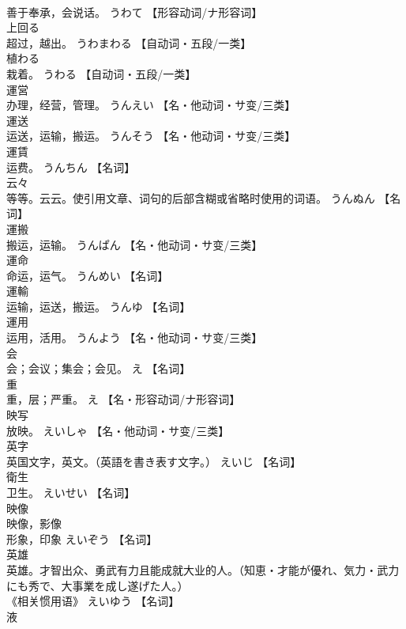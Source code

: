 \documentclass[8pt]{extreport}
\begin{document}
\begin{CJK}{UTF8}{min}
\\	善于奉承，会说话。	うわて		【形容动词/ナ形容词】
\\	上回る	
\\	超过，越出。	うわまわる		【自动词・五段/一类】
\\	植わる	
\\	栽着。	うわる		【自动词・五段/一类】
\\	運営	
\\	办理，经营，管理。	うんえい		【名・他动词・サ变/三类】
\\	運送	
\\	运送，运输，搬运。	うんそう		【名・他动词・サ变/三类】
\\	運賃	
\\	运费。	うんちん		【名词】
\\	云々	
\\	等等。云云。使引用文章、词句的后部含糊或省略时使用的词语。	うんぬん		【名词】
\\	運搬	
\\	搬运，运输。	うんぱん		【名・他动词・サ变/三类】
\\	運命	
\\	命运，运气。	うんめい		【名词】
\\	運輸	
\\	运输，运送，搬运。	うんゆ		【名词】
\\	運用	
\\	运用，活用。	うんよう		【名・他动词・サ变/三类】
\\	会	
\\	会；会议；集会；会见。	え		【名词】
\\	重	
\\	重，层；严重。	え		【名・形容动词/ナ形容词】
\\	映写	
\\	放映。	えいしゃ		【名・他动词・サ变/三类】
\\	英字	
\\	英国文字，英文。（英語を書き表す文字。）	えいじ		【名词】
\\	衛生	
\\	卫生。	えいせい		【名词】
\\	映像	
\\	映像，影像 
\\	形象，印象	えいぞう		【名词】
\\	英雄	
\\	英雄。才智出众、勇武有力且能成就大业的人。（知恵・才能が優れ、気力・武力にも秀で、大事業を成し遂げた人。） 
\\	《相关惯用语》	えいゆう		【名词】
\\	液	

\end{CJK}
\end{document}

